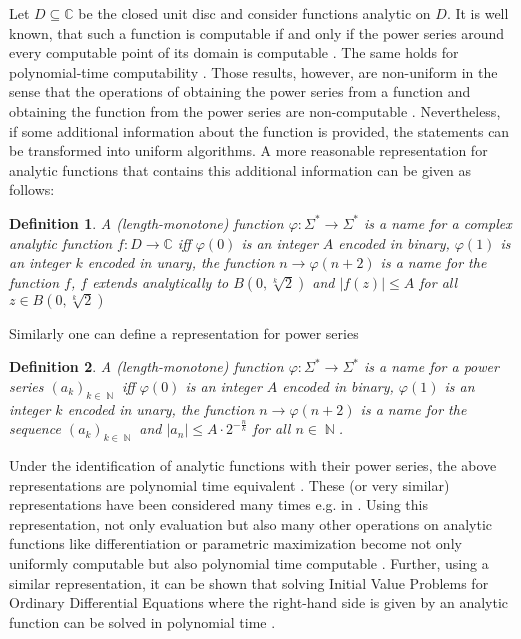 \documentclass[a4paper,11pt]{article}
\newcommand{\CC}{\mathbb C}
\DeclareMathOperator{\NN}{\mathbb N}
\newcommand{\abs}[1]{\left|#1\right|}
\newtheorem{definition}{Definition}
\begin{document}
Let $D \subseteq \CC$ be the closed unit disc and consider functions analytic on $D$.
It is well known, that such a function is computable if and only if the power series around every computable point of its domain is computable \cite{MR1005942}.
The same holds for polynomial-time computability \cite{MR1137517}. 
Those results, however, are non-uniform in the sense that the operations of obtaining the power series from a function and obtaining the function from the power series are non-computable \cite{Mueller87}.
Nevertheless, if some additional information about the function is provided, the statements can be transformed into uniform algorithms.
A more reasonable representation for analytic functions that contains this additional information can be given as follows: 
\begin{definition}\label{def:function}
  A (length-monotone) function $\varphi: \Sigma^* \to \Sigma^*$ is a name for a complex analytic function $f:D \to \CC$ iff
  $\varphi(0)$ is an integer $A$ encoded in binary,
  $\varphi(1)$ is an integer $k$ encoded in unary,
  the function $n \to \varphi(n+2)$ is a name for the function $f$,
  $f$ extends analytically to $B(0, \sqrt[k]{2})$ and
  $\abs{f(z)} \leq A$ for all $z \in B(0, \sqrt[k]{2})$

\end{definition}
Similarly one can define a representation for power series 
\begin{definition}\label{def:powerseries}
  A (length-monotone) function $\varphi: \Sigma^* \to \Sigma^*$ is a name for a power series $(a_k)_{k \in \NN}$ iff
  $\varphi(0)$ is an integer $A$ encoded in binary,
  $\varphi(1)$ is an integer $k$ encoded in unary,
  the function $n \to \varphi(n+2)$ is a name for the sequence $(a_k)_{k \in \NN}$ and
  $\abs{a_n} \leq A \cdot 2^{-\frac{n}{k}}$ for all $n \in \NN$.
\end{definition}
Under the identification of analytic functions with their power series, the above representations are polynomial time equivalent \cite{Kawamura2012}.
These (or very similar) representations have been considered many times e.g. in \cite{Mueller95, Kawamura2012,DBLP:journals/corr/PaulyS15,DBLP:journals/jsc/Hoeven05}.
Using this representation, not only evaluation but also many other operations on analytic functions like differentiation or parametric maximization become not only uniformly computable but also polynomial time computable \cite{Kawamura2012}.
Further, using a similar representation, it can be shown that solving Initial Value Problems for Ordinary Differential Equations where the right-hand side is given by an analytic function can be solved in polynomial time \cite{moiske1993solving}.
\end{document}
